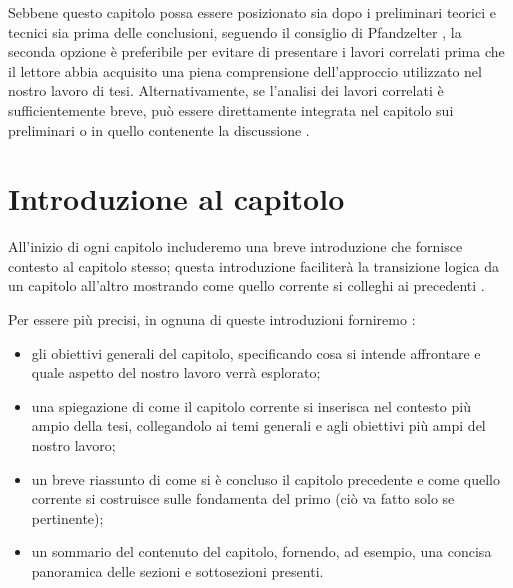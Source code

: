 \medskip

Sebbene questo capitolo possa essere posizionato sia dopo i preliminari teorici e tecnici sia prima delle conclusioni, seguendo il consiglio di Pfandzelter \etAl \cite{pfandzelter2022thesis}, la seconda opzione è preferibile per evitare di presentare i lavori correlati prima che il lettore abbia acquisito una piena comprensione dell'approccio utilizzato nel nostro lavoro di tesi. Alternativamente, se l'analisi dei lavori correlati è sufficientemente breve, può essere direttamente integrata nel capitolo sui preliminari o in quello contenente la discussione \cite{mannisto2022guide}.

\section{Introduzione al capitolo}

All'inizio di ogni capitolo includeremo una breve introduzione che fornisce contesto al capitolo stesso; questa introduzione faciliterà la transizione logica da un capitolo all'altro mostrando come quello corrente si colleghi ai precedenti \cite{zobel2015writing}.

\medskip

Per essere più precisi, in ognuna di queste introduzioni forniremo \cite{unibz2022thesis}:
\begin{itemize}

\item gli obiettivi generali del capitolo, specificando cosa si intende affrontare e quale aspetto del nostro lavoro verrà esplorato;

\item una spiegazione di come il capitolo corrente si inserisca nel contesto più ampio della tesi, collegandolo ai temi generali e agli obiettivi più ampi del nostro lavoro;

\item un breve riassunto di come si è concluso il capitolo precedente e come quello corrente si costruisce sulle fondamenta del primo (ciò va fatto solo se pertinente);

\item un sommario del contenuto del capitolo, fornendo, ad esempio, una concisa panoramica delle sezioni e sottosezioni presenti.

\end{itemize}

